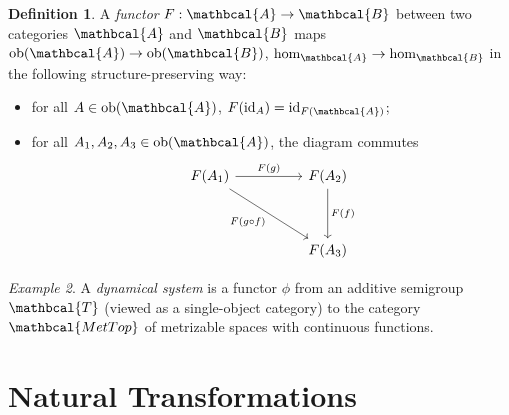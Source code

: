 \documentclass[a4paper, 10pt]{article}
\newcommand{\ob}{\text{ob}}
\newcommand{\id}{\text{id}}
\newcommand{\sA}{\mathbcal{A}}
\newcommand{\sB}{\mathbcal{B}}
\newcommand{\bT}{\mathbcal{T}}
\newcommand{\mettop}{\mathbcal{MetTop}}
\theoremstyle{definition}
\newtheorem{definition}{Definition}[section]
\theoremstyle{remark}
\theoremstyle{remark}
\newtheorem{example}[definition]{Example}
\begin{document}
\begin{definition}
    A \emph{functor} $F : \sA \to \sB$ between two categories $\sA$ and $\sB$ maps $\ob (\sA) \to \ob (\sB)$, $\hom_{\sA} \to \hom_{\sB}$ in the following structure-preserving way:

    \begin{itemize}
        \item for all $A \in \ob (\sA)$, $F(\id_A) = \id_{F(\sA)}$;
        \item for all $A_1, A_2, A_3 \in \ob (\sA)$, the diagram commutes
            \[\begin{tikzcd}
                {F(A_1)} && {F(A_2)} \\
                \\
                && {F(A_3)}
                \arrow["{F(f)}", from=1-3, to=3-3]
                \arrow["{F(g \circ f)}"', from=1-1, to=3-3]
                \arrow["{F(g)}", from=1-1, to=1-3]
            \end{tikzcd}\]
    \end{itemize}
\end{definition}

\begin{example}
    A \emph{dynamical system} is a functor $\phi$ from an additive semigroup $\bT$ (viewed as a single-object category) to the category $\mettop$ of metrizable spaces with continuous functions. 
\end{example}

\section{Natural Transformations}
\end{document}
